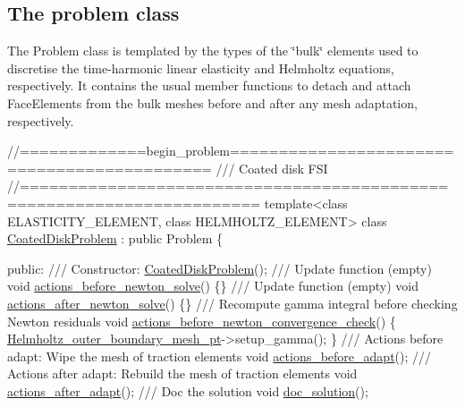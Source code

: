 \hypertarget{index_class}{}\subsection{The problem class}\label{index_class}
The {\ttfamily Problem} class is templated by the types of the \char`\"{}bulk\char`\"{} elements used to discretise the time-\/harmonic linear elasticity and Helmholtz equations, respectively. It contains the usual member functions to detach and attach {\ttfamily Face\+Elements} from the bulk meshes before and after any mesh adaptation, respectively.  
\begin{DoxyCodeInclude}
\textcolor{comment}{//=============begin\_problem============================================ }
\textcolor{comment}{/// Coated disk FSI}
\textcolor{comment}{}\textcolor{comment}{//====================================================================== }
\textcolor{keyword}{template}<\textcolor{keyword}{class} ELASTICITY\_ELEMENT, \textcolor{keyword}{class} HELMHOLTZ\_ELEMENT>
\textcolor{keyword}{class }\hyperlink{classCoatedDiskProblem}{CoatedDiskProblem} : \textcolor{keyword}{public} Problem
\{

\textcolor{keyword}{public}:
\textcolor{comment}{}
\textcolor{comment}{ /// Constructor:}
\textcolor{comment}{} \hyperlink{classCoatedDiskProblem_a9585ca5b422c72dc2b91cbb3e311b736}{CoatedDiskProblem}();
 \textcolor{comment}{}
\textcolor{comment}{ /// Update function (empty)}
\textcolor{comment}{} \textcolor{keywordtype}{void} \hyperlink{classCoatedDiskProblem_a3b94aaddee6a8f386ba249f418813963}{actions\_before\_newton\_solve}() \{\}
\textcolor{comment}{}
\textcolor{comment}{ /// Update function (empty)}
\textcolor{comment}{} \textcolor{keywordtype}{void} \hyperlink{classCoatedDiskProblem_aa0b9b4e706cdb1b31738c3db8759e9ee}{actions\_after\_newton\_solve}() \{\}
\textcolor{comment}{}
\textcolor{comment}{ /// Recompute gamma integral before checking Newton residuals}
\textcolor{comment}{} \textcolor{keywordtype}{void} \hyperlink{classCoatedDiskProblem_a8f52f13933fba3b053d50de544d8cafc}{actions\_before\_newton\_convergence\_check}()
  \{
   \hyperlink{classCoatedDiskProblem_a142852ffdecdb2f76acf3e4c11ce4b04}{Helmholtz\_outer\_boundary\_mesh\_pt}->setup\_gamma();
  \}
 \textcolor{comment}{}
\textcolor{comment}{ /// Actions before adapt: Wipe the mesh of traction elements}
\textcolor{comment}{} \textcolor{keywordtype}{void} \hyperlink{classCoatedDiskProblem_a89e972df172b024b1358f0fac7646d6d}{actions\_before\_adapt}();
\textcolor{comment}{}
\textcolor{comment}{ /// Actions after adapt: Rebuild the mesh of traction elements}
\textcolor{comment}{} \textcolor{keywordtype}{void} \hyperlink{classCoatedDiskProblem_a93f9d34cd24f08ca1ec726ae0057b939}{actions\_after\_adapt}();
\textcolor{comment}{}
\textcolor{comment}{ /// Doc the solution}
\textcolor{comment}{} \textcolor{keywordtype}{void} \hyperlink{classCoatedDiskProblem_af8e103d494f526c0e24c0c4ccef4ea6b}{doc\_solution}();


\end{DoxyCodeInclude}
